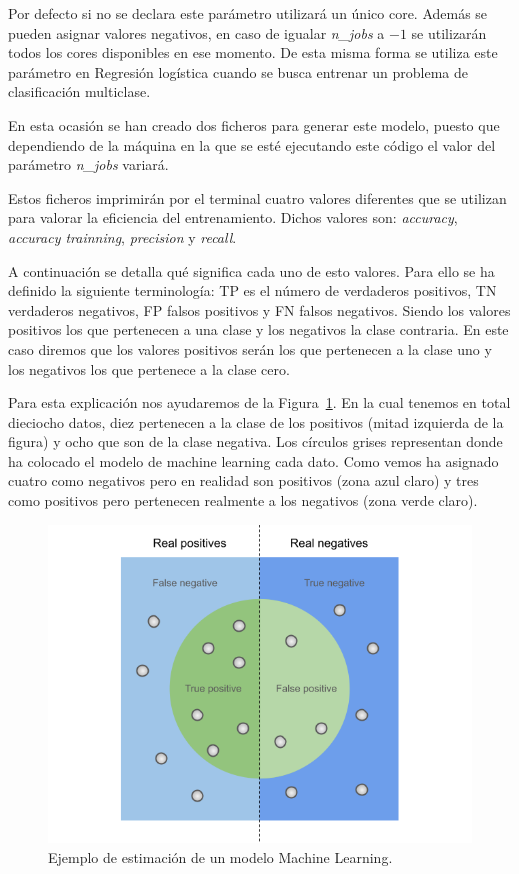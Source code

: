 \documentclass[a4paper, 12pt]{book}
\begin{document}
\begin{itemize}
Por defecto si no se declara este parámetro utilizará un único core. Además se pueden asignar valores negativos, en caso de igualar \textit{n\_jobs} a $-1$ se utilizarán todos los cores disponibles en ese momento. De esta misma forma se utiliza este parámetro en Regresión logística cuando se busca entrenar un problema de clasificación multiclase.

En esta ocasión se han creado dos ficheros para generar este modelo, puesto que dependiendo de la máquina en la que se esté ejecutando este código el valor del parámetro \textit{n\_jobs} variará. 

\end{itemize}

Estos ficheros imprimirán por el terminal cuatro valores diferentes que se utilizan para valorar la eficiencia del entrenamiento. Dichos valores son: \textit{accuracy}, \textit{accuracy trainning}, \textit{precision} y \textit{recall}. 

A continuación se detalla qué significa cada uno de esto valores. Para ello se ha definido la siguiente terminología: TP es el número de verdaderos positivos, TN verdaderos negativos, FP falsos positivos y FN falsos negativos. Siendo los valores positivos los que pertenecen a una clase y los negativos la clase contraria. En este caso diremos que los valores positivos serán los que pertenecen a la clase uno y los negativos los que pertenece a la clase cero. 

Para esta explicación nos ayudaremos de la Figura~\ref{fig:explicacion_acc}. En la cual tenemos en total dieciocho datos, diez pertenecen a la clase de los positivos (mitad izquierda de la figura) y ocho que son de la clase negativa. Los círculos grises representan donde ha colocado el modelo de machine learning cada dato. Como vemos ha asignado cuatro como negativos pero en realidad son positivos (zona azul claro) y tres como positivos pero pertenecen realmente a los negativos (zona verde claro).

\begin{figure}[]
  \centering
  \includegraphics[width=12cm, keepaspectratio]{img/explicacion_acc.png}
  \caption{Ejemplo de estimación de un modelo Machine Learning.}\label{fig:explicacion_acc}
\end{figure}
\end{document}
